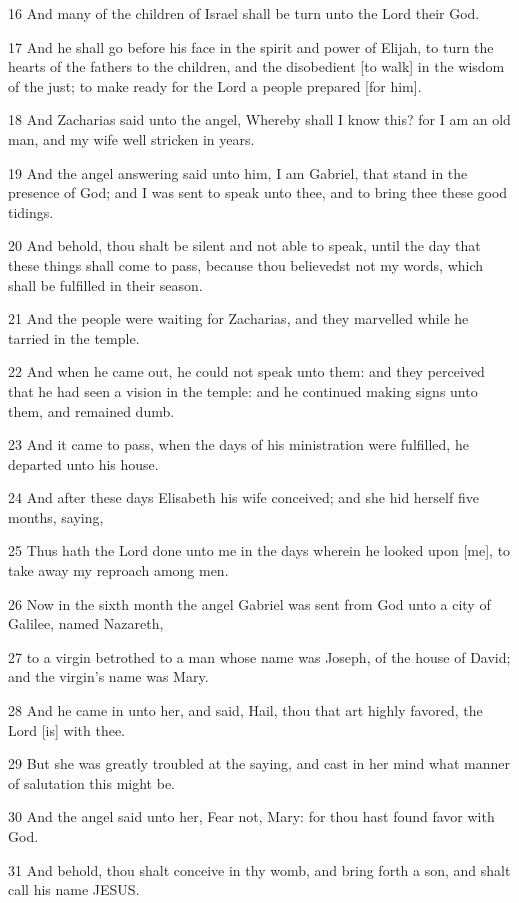 \par 16 And many of the children of Israel shall be turn unto the Lord their God.
\par 17 And he shall go before his face in the spirit and power of Elijah, to turn the hearts of the fathers to the children, and the disobedient [to walk] in the wisdom of the just; to make ready for the Lord a people prepared [for him].
\par 18 And Zacharias said unto the angel, Whereby shall I know this? for I am an old man, and my wife well stricken in years.
\par 19 And the angel answering said unto him, I am Gabriel, that stand in the presence of God; and I was sent to speak unto thee, and to bring thee these good tidings.
\par 20 And behold, thou shalt be silent and not able to speak, until the day that these things shall come to pass, because thou believedst not my words, which shall be fulfilled in their season.
\par 21 And the people were waiting for Zacharias, and they marvelled while he tarried in the temple.
\par 22 And when he came out, he could not speak unto them: and they perceived that he had seen a vision in the temple: and he continued making signs unto them, and remained dumb.
\par 23 And it came to pass, when the days of his ministration were fulfilled, he departed unto his house.
\par 24 And after these days Elisabeth his wife conceived; and she hid herself five months, saying,
\par 25 Thus hath the Lord done unto me in the days wherein he looked upon [me], to take away my reproach among men.
\par 26 Now in the sixth month the angel Gabriel was sent from God unto a city of Galilee, named Nazareth,
\par 27 to a virgin betrothed to a man whose name was Joseph, of the house of David; and the virgin's name was Mary.
\par 28 And he came in unto her, and said, Hail, thou that art highly favored, the Lord [is] with thee.
\par 29 But she was greatly troubled at the saying, and cast in her mind what manner of salutation this might be.
\par 30 And the angel said unto her, Fear not, Mary: for thou hast found favor with God.
\par 31 And behold, thou shalt conceive in thy womb, and bring forth a son, and shalt call his name JESUS.
